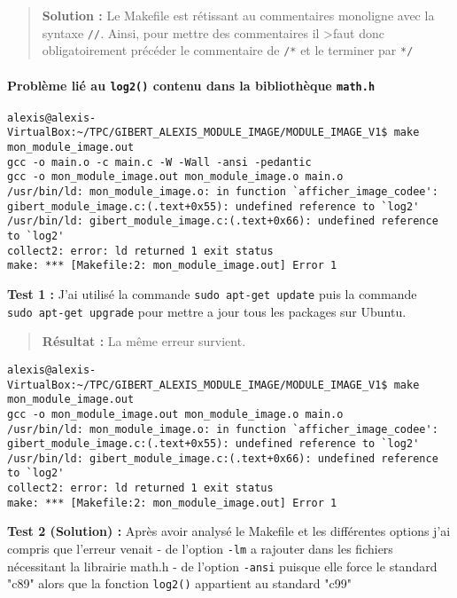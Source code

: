 \documentclass[11pt]{article}
\begin{document}
\begin{quote}
\textbf{Solution :} Le Makefile est rétissant au commentaires monoligne
avec la syntaxe \texttt{//}. Ainsi, pour mettre des commentaires il
\textgreater{}faut donc obligatoirement précéder le commentaire de
\texttt{/*} et le terminer par \texttt{*/}
\end{quote}

\paragraph{\texorpdfstring{Problème lié au \texttt{log2()} contenu dans
la bibliothèque
\texttt{math.h}}{Problème lié au log2() contenu dans la bibliothèque math.h}}\label{probluxe8me-liuxe9-au-log2-contenu-dans-la-bibliothuxe8que-math.h}

\begin{verbatim}
alexis@alexis-VirtualBox:~/TPC/GIBERT_ALEXIS_MODULE_IMAGE/MODULE_IMAGE_V1$ make mon_module_image.out
gcc -o main.o -c main.c -W -Wall -ansi -pedantic
gcc -o mon_module_image.out mon_module_image.o main.o
/usr/bin/ld: mon_module_image.o: in function `afficher_image_codee':
gibert_module_image.c:(.text+0x55): undefined reference to `log2'
/usr/bin/ld: gibert_module_image.c:(.text+0x66): undefined reference to `log2'
collect2: error: ld returned 1 exit status
make: *** [Makefile:2: mon_module_image.out] Error 1
\end{verbatim}

\textbf{Test 1 :} J'ai utilisé la commande
\texttt{sudo\ apt-get\ update} puis la commande
\texttt{sudo\ apt-get\ upgrade} pour mettre a jour tous les packages sur
Ubuntu.

\begin{quote}
\textbf{Résultat :} La même erreur survient.
\end{quote}

\begin{verbatim}
alexis@alexis-VirtualBox:~/TPC/GIBERT_ALEXIS_MODULE_IMAGE/MODULE_IMAGE_V1$ make mon_module_image.out
gcc -o mon_module_image.out mon_module_image.o main.o
/usr/bin/ld: mon_module_image.o: in function `afficher_image_codee':
gibert_module_image.c:(.text+0x55): undefined reference to `log2'
/usr/bin/ld: gibert_module_image.c:(.text+0x66): undefined reference to `log2'
collect2: error: ld returned 1 exit status
make: *** [Makefile:2: mon_module_image.out] Error 1
\end{verbatim}

\textbf{Test 2 (Solution) :} Après avoir analysé le Makefile et les
différentes options j'ai compris que l'erreur venait - de l'option
\texttt{-lm} a rajouter dans les fichiers nécessitant la librairie
math.h - de l'option \texttt{-ansi} puisque elle force le standard "c89"
alors que la fonction \texttt{log2()} appartient au standard "c99"
\end{document}
